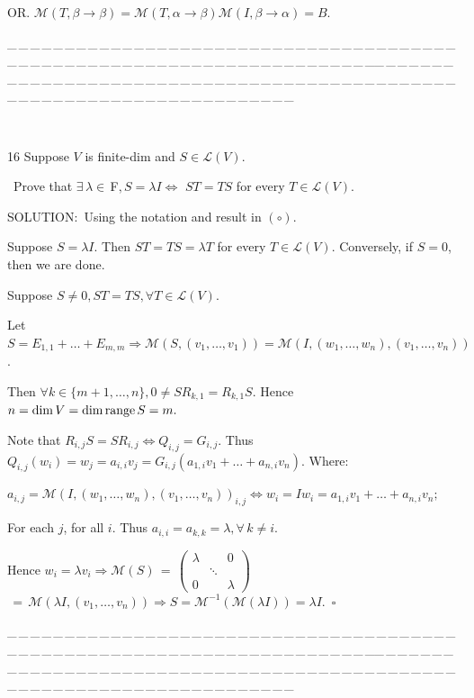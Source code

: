 \documentclass[a4paper, 11pt, UTF8]{article}
\def\range{\textup{range}\,}
\def\Lm{\mathcal{L}}
\def\Mt{\mathcal{M}}
\def\Fbfc{$\,{\timesbf F}$}
\begin{document}
\begin{large}
O{\small R}. $\Mt(T,\beta\rightarrow\beta)=\Mt(T,\alpha\rightarrow\beta)\Mt(I,\beta\rightarrow\alpha)=B.$\par
{\tiny \_\,\_\,\_\,\_\,\_\,\_\,\_\,\_\,\_\,\_\,\_\,\_\,\_\,\_\,\_\,\_\,\_\,\_\,\_\,\_\,\_\,\_\,\_\,\_\,\_\,\_\,\_\,\_\,\_\,\_\,\_\,\_\,\_\,\_\,\_\,\_\,\_\,\_\,\_\,\_\,\_\,\_\,\_\,\_\,\_\,\_\,\_\,\_\,\_\,\_\,\_\,\_\,\_\,\_\,\_\,\_\,\_\,\_\,\_\,\_\,\_\,\_\,\_\,\_\,\_\,\_\,\_\,\_\,\_\,\_\,\_\_\,\_\,\_\,\_\,\_\,\_\,\_\,\_\,\_\,\_\,\_\,\_\,\_\,\_\,\_\,\_\,\_\,\_\,\_\,\_\,\_\,\_\,\_\,\_\,\_\,\_\,\_\,\_\,\_\,\_\,\_\,\_\,\_\,\_\,\_\,\_\,\_\,\_\,\_\,\_\,\_\,\_\,\_\,\_\,\_\,\_\,\_\,\_\,\_\,\_\,\_\,\_\,\_\,\_\,\_\,\_\,\_\,\_\,\_\,\_\,\_\,\_\,\_\,\_\,\_\,\_\,\_\,\_\,\_\,\_\,\_}{\tiny\,\par}

{\timesbf\Large 16} {\timessl\Large 
Suppose $V$ is finite-dim and $S\in\Lm(V)$.}\par\quad\,
{\timessl\Large Prove that $\exists\,\lambda\in\Fbfc,S=\lambda I\Longleftrightarrow$ $ST=TS$ for every $T\in\Lm(V)$.
}\par
{\timesbf S\footnotesize{OLUTION:}}\,\,\,Using the notation and result in $(\circ)$.\par\quad
Suppose $S=\lambda I$. Then $ST=TS=\lambda T$ for every $T\in\Lm(V).$ Conversely, if $S=0$, then we are done.\par\quad
Suppose $S\neq 0,ST=TS,\forall T\in\Lm(V).$\par\quad
Let $S=E_{1,1}+\dots+E_{m,m}\Rightarrow \Mt(S,(v_1,\dots,v_1))=\Mt(I,(w_1,\dots,w_n),(v_1,\dots,v_n))$.\par\quad
Then $\forall k\in\{m+1,\dots,n\},0\neq SR_{k,1}=R_{k,1}S.$ Hence $n=\dim V=\dim\range S=m.$\par\quad
Note that $R_{i,j}S=SR_{i,j}\Longleftrightarrow Q_{i,j}=G_{i,j}$. Thus $Q_{i,j}(w_i)=w_j=a_{i,i}v_j=G_{i,j}(a_{1,i} v_1+\dots+a_{n,i} v_n).$ Where:\par\qquad
$a_{i,j}=\Mt(I,(w_1,\dots,w_n),(v_1,\dots,v_n))_{i,j}\Longleftrightarrow w_i=Iw_i=a_{1,i} v_1 +\dots+a_{n,i} v_n;$\par\qquad
For each $j$, for all $i.$ Thus $a_{i,i}=a_{k,k}=\lambda, \forall\, k\neq i.$\par\quad
Hence $w_i=\lambda v_i\Rightarrow\Mt(S)\,=\,${\small$\begin{pmatrix}
\lambda & & 0\\
& \ddots \\
0 & & \lambda
\end{pmatrix}$}$\,=\,\Mt(\lambda I,(v_1,\dots,v_n))\Rightarrow S=\Mt^{-1}(\Mt(\lambda I))=\lambda I.\,\,\,\square$\par
{\tiny \_\,\_\,\_\,\_\,\_\,\_\,\_\,\_\,\_\,\_\,\_\,\_\,\_\,\_\,\_\,\_\,\_\,\_\,\_\,\_\,\_\,\_\,\_\,\_\,\_\,\_\,\_\,\_\,\_\,\_\,\_\,\_\,\_\,\_\,\_\,\_\,\_\,\_\,\_\,\_\,\_\,\_\,\_\,\_\,\_\,\_\,\_\,\_\,\_\,\_\,\_\,\_\,\_\,\_\,\_\,\_\,\_\,\_\,\_\,\_\,\_\,\_\,\_\,\_\,\_\,\_\,\_\,\_\,\_\,\_\,\_\_\,\_\,\_\,\_\,\_\,\_\,\_\,\_\,\_\,\_\,\_\,\_\,\_\,\_\,\_\,\_\,\_\,\_\,\_\,\_\,\_\,\_\,\_\,\_\,\_\,\_\,\_\,\_\,\_\,\_\,\_\,\_\,\_\,\_\,\_\,\_\,\_\,\_\,\_\,\_\,\_\,\_\,\_\,\_\,\_\,\_\,\_\,\_\,\_\,\_\,\_\,\_\,\_\,\_\,\_\,\_\,\_\,\_\,\_\,\_\,\_\,\_\,\_\,\_\,\_\,\_\,\_\,\_\,\_\,\_\,\_}\par


\end{large}
\end{document}
